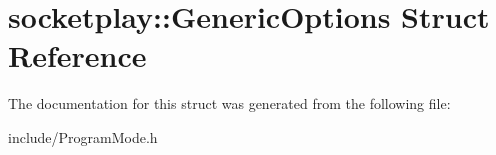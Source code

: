 \hypertarget{structsocketplay_1_1GenericOptions}{}\section{socketplay\+:\+:Generic\+Options Struct Reference}
\label{structsocketplay_1_1GenericOptions}


The documentation for this struct was generated from the following file\+:\begin{DoxyCompactItemize}
\item 
include/Program\+Mode.\+h\end{DoxyCompactItemize}
